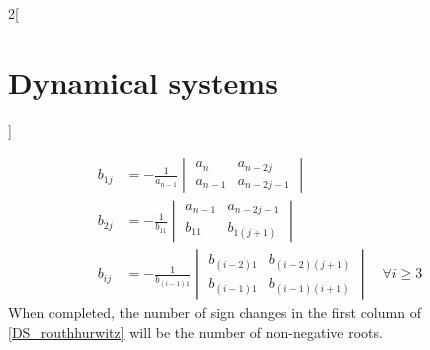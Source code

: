 \documentclass[../../../main_math.tex]{subfiles}
\begin{document}
\begin{multicols}{2}[\section{Dynamical systems}]
\begin{proposition}
    \begin{align*}
      b_{1j} & =-\frac{1}{a_{n-1}}\begin{vmatrix}
                                    a_n     & a_{n-2j}   \\
                                    a_{n-1} & a_{n-2j-1}
                                  \end{vmatrix}                  \\
      b_{2j} & =-\frac{1}{b_{11}}\begin{vmatrix}
                                   a_{n-1} & a_{n-2j-1} \\
                                   b_{11}  & b_{1(j+1)}
                                 \end{vmatrix}                   \\
      b_{ij} & =-\frac{1}{b_{(i-1)1}}\begin{vmatrix}
                                       b_{(i-2)1} & b_{(i-2)(j+1)} \\
                                       b_{(i-1)1} & b_{(i-1)(i+1)}
                                     \end{vmatrix} \quad\forall i\geq 3
    \end{align*}
    When completed, the number of sign changes in the first column of \cref{DS_routhhurwitz} will be the number of non-negative roots.
  \end{proposition}

\end{multicols}
\end{document}
